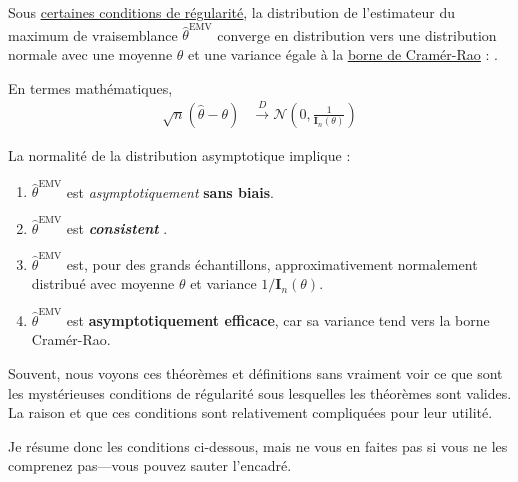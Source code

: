 \documentclass[french]{article}
\begin{document}
\begin{multicols*}{2}
\begin{definitionNOHFILLsub}
Sous \underline{\hyperlink{reg_cond}{\color{blue!40!green!80!black}certaines conditions de régularité}}, la distribution de l'estimateur du maximum de vraisemblance $\hat{\theta}^{\text{EMV}}$ converge en distribution vers une distribution normale avec une moyenne $\theta$ et une variance égale à la \underline{\hyperref[sec:cramer_rao]{borne de Cramér-Rao}} : .

\bigskip

En termes mathématiques, 
\begin{align*}
	\sqrt{n}\left( \hat{\theta}	-	\theta \right)
	&\overset{D}{\rightarrow}
	\mathcal{N}\left( 0, \frac{1}{\bm{I}_{n}(\theta)} \right)
\end{align*}

\bigskip

La normalité de la distribution asymptotique implique :
\begin{enumerate}
	\item	$\hat{\theta}^{\text{EMV}}$ est \textit{asymptotiquement} \textbf{sans biais}.
	\item	$\hat{\theta}^{\text{EMV}}$ est \og \textit{\textbf{consistent}} \fg{}.
	\item	$\hat{\theta}^{\text{EMV}}$ est, pour des grands échantillons, approximativement normalement distribué avec moyenne $\theta$ et variance $1/\bm{I}_{n}(\theta)$.
	\item	$\hat{\theta}^{\text{EMV}}$ est \textbf{asymptotiquement efficace}, car sa variance tend vers la borne Cramér-Rao.
\end{enumerate}
\end{definitionNOHFILLsub}
	
\begin{rappel_enhanced}[Contexte]
Souvent, nous voyons ces théorèmes et définitions sans vraiment voir ce que sont les mystérieuses conditions de régularité sous lesquelles les théorèmes sont valides. La raison et que ces conditions sont relativement compliquées pour leur utilité. 

Je résume donc les conditions ci-dessous, mais ne vous en faites pas si vous ne les comprenez pas---vous pouvez sauter l'encadré.
\end{rappel_enhanced}


\end{multicols*}
\end{document}
